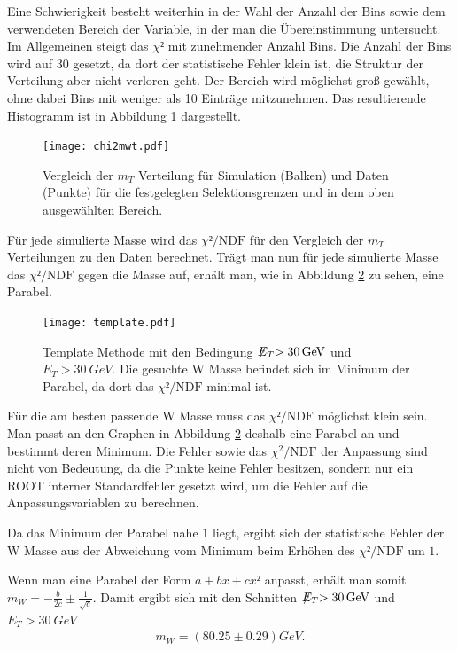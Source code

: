 \documentclass[a4paper,12pt]{article}
\newcommand{\met}{\ensuremath{\not\mathrel{E}}_T}
\begin{document}
Eine Schwierigkeit besteht weiterhin in der Wahl der Anzahl der Bins sowie dem verwendeten
Bereich der Variable, in der man die Übereinstimmung untersucht. Im Allgemeinen steigt das $χ²$ mit zunehmender Anzahl Bins. Die Anzahl der Bins wird auf
30 gesetzt, da dort der statistische Fehler klein ist, die Struktur der Verteilung aber nicht
verloren geht. Der Bereich wird möglichst groß gewählt, ohne dabei Bins mit weniger als 10 Einträge
mitzunehmen. Das resultierende Histogramm ist in Abbildung \ref{fig:compareHistoMT} dargestellt.

\begin{figure}[htb]
	\centering
	\texttt{[image: chi2mwt.pdf]}
	\caption{Vergleich der $m_T$ Verteilung für Simulation (Balken) und Daten (Punkte) für die
		festgelegten Selektionsgrenzen und in dem oben ausgewählten Bereich.}
	\label{fig:compareHistoMT}
\end{figure}

Für jede simulierte Masse wird das  $χ²/\text{NDF}$ für den Vergleich der $m_T$ Verteilungen
zu den Daten berechnet. 
Trägt man nun für jede simulierte Masse das $χ²/\text{NDF}$ gegen die Masse auf,
erhält man, wie in Abbildung \ref{fig:template} zu sehen, eine Parabel.

\begin{figure}[htb]
	\centering
	\texttt{[image: template.pdf]}
	\caption{Template Methode mit den Bedingung $\met > \SI{30}{GeV}$ und $E_{T} > \SI{30}{GeV}$. Die gesuchte W Masse befindet sich im Minimum der Parabel, da dort
		das $χ²/\text{NDF}$ minimal ist.}
	\label{fig:template}
\end{figure}

Für die am besten passende W Masse muss das $χ²/\text{NDF}$ möglichst klein sein. Man passt an den
Graphen in Abbildung \ref{fig:template} deshalb eine Parabel an und bestimmt deren Minimum. Die
Fehler sowie das $χ^2/\text{NDF}$ der Anpassung sind nicht von Bedeutung, da die Punkte keine
Fehler besitzen, sondern nur ein ROOT interner Standardfehler gesetzt wird, um die Fehler auf die
Anpassungsvariablen zu berechnen.

Da das Minimum der Parabel nahe $1$ liegt, ergibt sich der statistische Fehler der W Masse aus der Abweichung vom Minimum beim Erhöhen des
$χ²/\text{NDF}$ um $1$.

Wenn man eine Parabel der Form $a + bx + cx²$ anpasst, erhält man somit $m_W = -\frac{b}{2c} ±
\frac{1}{\sqrt{c}}$.
Damit ergibt sich mit den Schnitten $\met > \SI{30}{GeV}$ und $E_{T} > \SI{30}{GeV}$
\begin{align*}
	m_W =  ( 80.25 ± 0.29  ) \si{GeV}.
\end{align*}
\end{document}
